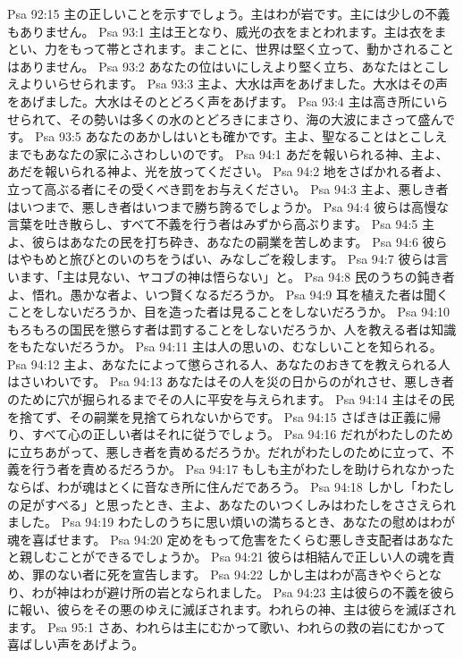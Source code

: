 Psa 92:15  主の正しいことを示すでしょう。主はわが岩です。主には少しの不義もありません。
Psa 93:1  主は王となり、威光の衣をまとわれます。主は衣をまとい、力をもって帯とされます。まことに、世界は堅く立って、動かされることはありません。
Psa 93:2  あなたの位はいにしえより堅く立ち、あなたはとこしえよりいらせられます。
Psa 93:3  主よ、大水は声をあげました。大水はその声をあげました。大水はそのとどろく声をあげます。
Psa 93:4  主は高き所にいらせられて、その勢いは多くの水のとどろきにまさり、海の大波にまさって盛んです。
Psa 93:5  あなたのあかしはいとも確かです。主よ、聖なることはとこしえまでもあなたの家にふさわしいのです。
Psa 94:1  あだを報いられる神、主よ、あだを報いられる神よ、光を放ってください。
Psa 94:2  地をさばかれる者よ、立って高ぶる者にその受くべき罰をお与えください。
Psa 94:3  主よ、悪しき者はいつまで、悪しき者はいつまで勝ち誇るでしょうか。
Psa 94:4  彼らは高慢な言葉を吐き散らし、すべて不義を行う者はみずから高ぶります。
Psa 94:5  主よ、彼らはあなたの民を打ち砕き、あなたの嗣業を苦しめます。
Psa 94:6  彼らはやもめと旅びとのいのちをうばい、みなしごを殺します。
Psa 94:7  彼らは言います、「主は見ない、ヤコブの神は悟らない」と。
Psa 94:8  民のうちの鈍き者よ、悟れ。愚かな者よ、いつ賢くなるだろうか。
Psa 94:9  耳を植えた者は聞くことをしないだろうか、目を造った者は見ることをしないだろうか。
Psa 94:10  もろもろの国民を懲らす者は罰することをしないだろうか、人を教える者は知識をもたないだろうか。
Psa 94:11  主は人の思いの、むなしいことを知られる。
Psa 94:12  主よ、あなたによって懲らされる人、あなたのおきてを教えられる人はさいわいです。
Psa 94:13  あなたはその人を災の日からのがれさせ、悪しき者のために穴が掘られるまでその人に平安を与えられます。
Psa 94:14  主はその民を捨てず、その嗣業を見捨てられないからです。
Psa 94:15  さばきは正義に帰り、すべて心の正しい者はそれに従うでしょう。
Psa 94:16  だれがわたしのために立ちあがって、悪しき者を責めるだろうか。だれがわたしのために立って、不義を行う者を責めるだろうか。
Psa 94:17  もしも主がわたしを助けられなかったならば、わが魂はとくに音なき所に住んだであろう。
Psa 94:18  しかし「わたしの足がすべる」と思ったとき、主よ、あなたのいつくしみはわたしをささえられました。
Psa 94:19  わたしのうちに思い煩いの満ちるとき、あなたの慰めはわが魂を喜ばせます。
Psa 94:20  定めをもって危害をたくらむ悪しき支配者はあなたと親しむことができるでしょうか。
Psa 94:21  彼らは相結んで正しい人の魂を責め、罪のない者に死を宣告します。
Psa 94:22  しかし主はわが高きやぐらとなり、わが神はわが避け所の岩となられました。
Psa 94:23  主は彼らの不義を彼らに報い、彼らをその悪のゆえに滅ぼされます。われらの神、主は彼らを滅ぼされます。
Psa 95:1  さあ、われらは主にむかって歌い、われらの救の岩にむかって喜ばしい声をあげよう。
